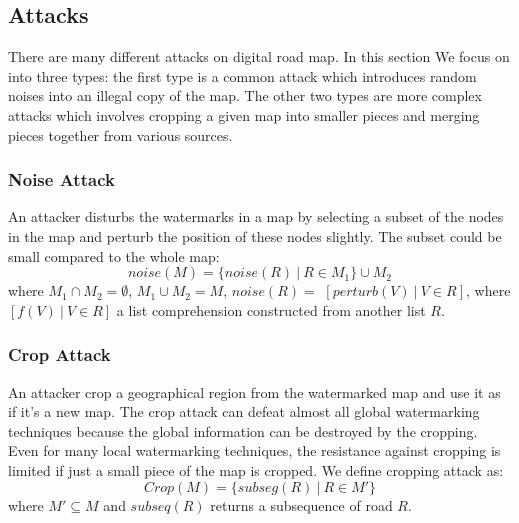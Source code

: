 \subsection{Attacks}
There are many different attacks on digital road map. In this section
We focus on into three types: the first type is a common attack which introduces
random noises into an illegal copy of the map. The other two types are more
complex attacks which involves cropping a given map into smaller pieces and merging
pieces together from various sources.

\subsubsection*{Noise Attack}
An attacker disturbs the watermarks in a map by selecting a subset of the nodes in
the map and perturb the position of these nodes slightly. The subset could be small
compared to the whole map: 
\[noise(M)= \{noise(R) ~|~ R \in M_1\} \cup M_2 \]
where $M_1 \cap M_2 = \emptyset$, $M_1 \cup M_2 = M$,
$noise(R) = $ $[perturb(V)~ |~ V \in R]$,
where $[f(V)~|~ V \in R ]$ a list comprehension constructed
from another list $R$.

\subsubsection*{Crop Attack}
An attacker crop a geographical region from the watermarked map and use it 
as if it's a new map. The crop attack can defeat almost all global 
watermarking techniques because the global information can be destroyed 
by the cropping. %
Even for many local watermarking techniques, the resistance against cropping
is limited if just a small piece of the map is cropped.
We define cropping attack as:
\[
Crop(M) = \{ subseg(R) ~|~ R \in M'\}
\]
where 
$M' \subseteq M$ and $subseq (R)$ returns a subsequence of road $R$.

